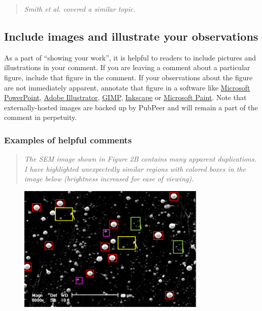 \documentclass[letterpaper, 12pt]{article}
\begin{document}
\begin{quote}
    \textit{Smith et al. covered a similar topic.}
\end{quote}

\subsection*{Include images and illustrate your observations}

As a part of ``showing your work'', it is helpful to readers to include pictures and illustrations in your comment. If you are leaving a comment about a particular figure, include that figure in the comment. If your observations about the figure are not immediately apparent, annotate that figure in a software like \href{https://www.microsoft.com/en-us/microsoft-365/powerpoint}{Microsoft PowerPoint}, \href{https://www.adobe.com/products/illustrator.html}{Adobe Illustrator}, \href{https://www.gimp.org/}{GIMP}, \href{https://inkscape.org/}{Inkscape} or \href{https://www.microsoft.com/en-us/windows/paint}{Microsoft Paint}. Note that externally-hosted images are backed up by PubPeer and will remain a part of the comment in perpetuity.

\subsubsection*{Examples of helpful comments}

\begin{quote}
    \textit{The SEM image shown in Figure 2B contains many apparent duplications. I have highlighted unexpectedly similar regions with colored boxes in the image below (brightness increased for ease of viewing).}
\end{quote}

\begin{figure}[h!tbp]
\centering
    \includegraphics[width=0.8\textwidth]{img/pubpeer/pubpeer_dupes.png}
\end{figure}
\end{document}
